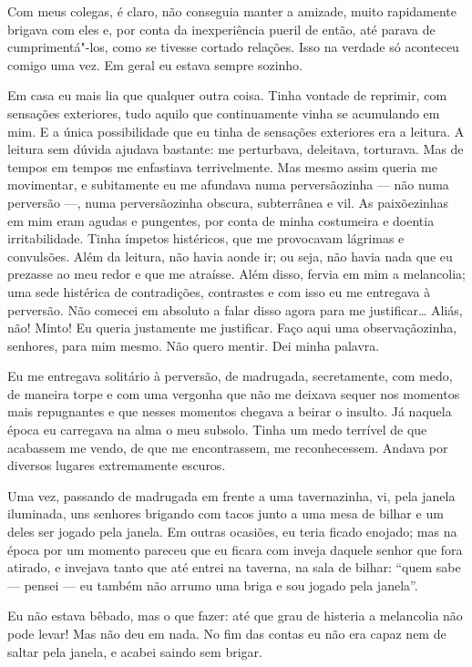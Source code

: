 Com meus colegas, é claro, não conseguia manter a amizade, muito
rapidamente brigava com eles e, por conta da inexperiência pueril de
então, até parava de cumprimentá"-los, como se tivesse cortado relações.
Isso na verdade só aconteceu comigo uma vez. Em geral eu estava sempre
sozinho.

Em casa eu mais lia que qualquer outra coisa. Tinha vontade de reprimir,
com sensações exteriores, tudo aquilo que continuamente vinha se
acumulando em mim. E a única possibilidade que eu tinha de sensações
exteriores era a leitura. A leitura sem dúvida ajudava bastante: me
perturbava, deleitava, torturava. Mas de tempos em tempos me enfastiava
terrivelmente. Mas mesmo assim queria me movimentar, e subitamente eu
me afundava numa perversãozinha --- não numa perversão ---, numa
perversãozinha obscura, subterrânea e vil. As paixõezinhas em mim eram
agudas e pungentes, por conta de minha costumeira e doentia
irritabilidade. Tinha ímpetos histéricos, que me provocavam lágrimas e
convulsões. Além da leitura, não havia aonde ir; ou seja, não havia
nada que eu prezasse ao meu redor e que me atraísse. Além disso, fervia
em mim a melancolia; uma sede histérica de contradições, contrastes e
com isso eu me entregava à perversão. Não comecei em absoluto a falar
disso agora para me justificar\ldots{} Aliás, não! Minto! Eu queria
justamente me justificar. Faço aqui uma observaçãozinha, senhores, para
mim mesmo. Não quero mentir. Dei minha palavra.

Eu me entregava solitário à perversão, de madrugada, secretamente, com
medo, de maneira torpe e com uma vergonha que não me deixava sequer nos
momentos mais repugnantes e que nesses momentos chegava a beirar o
insulto. Já naquela época eu carregava na alma o meu subsolo. Tinha um
medo terrível de que acabassem me vendo, de que me encontrassem, me
reconhecessem. Andava por diversos lugares extremamente escuros.

Uma vez, passando de madrugada em frente a uma tavernazinha, vi, pela
janela iluminada, uns senhores brigando com tacos junto a uma mesa de
bilhar e um deles ser jogado pela janela. Em outras ocasiões, eu teria
ficado enojado; mas na época por um momento pareceu que eu ficara com
inveja daquele senhor que fora atirado, e invejava tanto que até entrei
na taverna, na sala de bilhar: ``quem sabe --- pensei --- eu também não
arrumo uma briga e sou jogado pela janela''.

Eu não estava bêbado, mas o que fazer: até que grau de histeria a
melancolia não pode levar! Mas não deu em nada. No fim das contas eu
não era capaz nem de saltar pela janela, e acabei saindo sem brigar.

